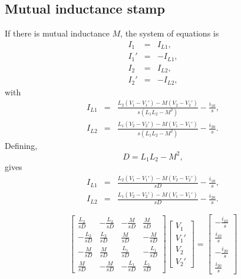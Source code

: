 \documentclass[a4paper, 12pt]{article}
\newcommand{\encp}[1]{\left(#1\right)}
\begin{document}
\subsection{Mutual inductance stamp}

If there is mutual inductance $M$, the system of equations is
%
\begin{eqnarray}
  I_1 & = & I_{L1}, \\
  I_1' & = & -I_{L1}, \\
  I_2 & = & I_{L2}, \\
  I_2' & = & -I_{L2},
\end{eqnarray}
%
with
%
\begin{eqnarray}
  I_{L1} & = & \frac{L_2\encp{V_1 - V_1'} - M\encp{V_2 - V_2'}}{s\encp{L_1 L_2 - M^2}} - \frac{i_{10}}{s}, \\
  I_{L2} & = & \frac{L_1\encp{V_2 - V_2'} - M\encp{V_1 - V_1'}}{s\encp{L_1 L_2 - M^2}} - \frac{i_{20}}{s}.
\end{eqnarray}
%
Defining,
%
\begin{equation}
  D  = L_1 L_2 - M^2,
\end{equation}
%
gives
%
\begin{eqnarray}
  I_{L1} & = & \frac{L_2\encp{V_1 - V_1'} - M\encp{V_2 - V_2'}}{sD} - \frac{i_{10}}{s}, \\
  I_{L2} & = & \frac{L_1\encp{V_2 - V_2'} - M\encp{V_1 - V_1'}}{sD} - \frac{i_{20}}{s}.
\end{eqnarray}
%

\begin{equation}
  \begin{bmatrix}
    \frac{L_2}{sD} & -\frac{L_2}{sD} & -\frac{M}{sD}  & \frac{M}{sD} \\
   -\frac{L_2}{sD} & \frac{L_2}{sD}  & \frac{M}{sD}  & -\frac{M}{sD} \\
  -\frac{M}{sD} & \frac{M}{sD} &  \frac{L_1}{sD} & -\frac{L_1}{sD}   \\
   \frac{M}{sD} & -\frac{M}{sD} & -\frac{L_1}{sD} & \frac{L_1}{sD}  
  \end{bmatrix}
  \begin{bmatrix}
    V_1 \\ V_1' \\ V_2 \\ V_2'
  \end{bmatrix}
=
\begin{bmatrix}
  -\frac{i_{10}}{s} \\ \frac{i_{10}}{s} \\
  -\frac{i_{20}}{s} \\ \frac{i_{20}}{s}
\end{bmatrix}
\label{eqn:mutual_stamp1}
\end{equation}
\end{document}
